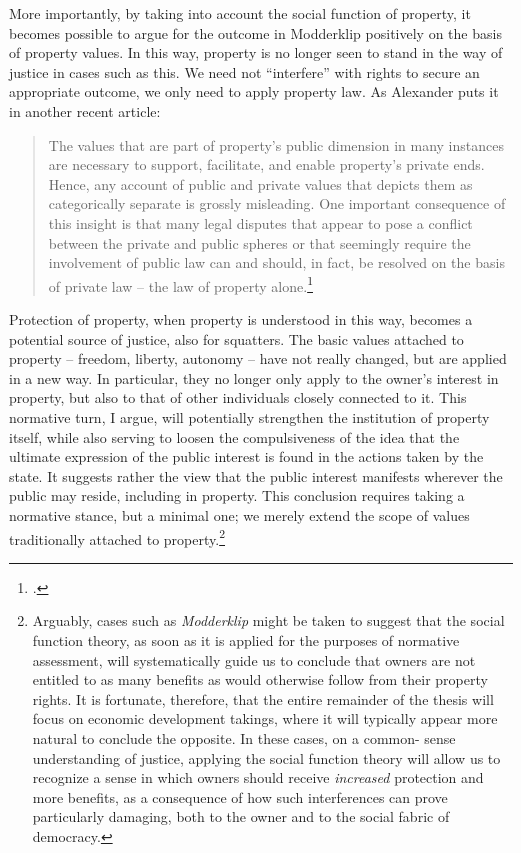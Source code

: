 \documentclass[12pt,a4paper]{book} %
\begin{document}
More importantly, by taking into account the social function of property, it becomes possible to argue for the outcome in Modderklip positively on the basis of property values. In this way, property is no longer seen to stand in the way of justice in cases such as this. We need not ``interfere'' with rights to secure an appropriate outcome, we only need to apply property law. As Alexander puts it in another recent article: 

\begin{quote} The values that are
part of property's public dimension in many instances are necessary
to support, facilitate, and enable property's private ends.
Hence, any account of public and private values that depicts them as categorically
separate is grossly misleading. One important consequence of this
insight is that many legal disputes that appear to pose a conflict between
the private and public spheres or that seemingly
require the involvement of public law can and
should, in fact, be resolved on the basis of private law -- the law
of property alone.\footcite[1295-1296]{alexander14} \end{quote}

Protection of property, when property is understood in this way, becomes a potential source of justice, also for squatters. The basic values attached to property -- freedom, liberty, autonomy -- have not really changed, but are applied in a new way. In particular, they no longer only apply to the owner's interest in property, but also to that of other individuals closely connected to it. This normative turn, I argue, will potentially strengthen the institution of property itself, while also serving to loosen the compulsiveness of the idea that the ultimate expression of the public interest is found in the actions taken by the state. It suggests rather the view that the public interest manifests wherever the public may reside, including in property. This conclusion requires taking a normative stance, but a minimal one; we merely extend the scope of values traditionally attached to property.\footnote{Arguably, cases such as {\it Modderklip} might be taken to suggest that the social function theory, as soon as it is applied for the purposes of normative assessment, will systematically guide us to conclude that owners are not entitled to as many benefits as would otherwise follow from their property rights. It is fortunate, therefore, that the entire remainder of the thesis will focus on economic development takings, where it will typically appear more natural to conclude the opposite. In these cases, on a common- sense understanding of justice, applying the social function theory will allow us to recognize a sense in which owners should receive {\it increased} protection and more benefits, as a consequence of how such interferences can prove particularly damaging, both to the owner and to the social fabric of democracy.} 
\end{document}
